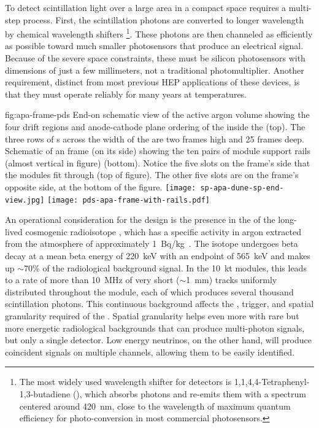 To detect scintillation light over a large area in a compact space requires a multi-step process.  First, the  scintillation photons are converted to longer wavelength by chemical wavelength shifters
\footnote{The most widely used wavelength shifter for \lar detectors is  1,1,4,4-Tetraphenyl-1,3-butadiene (), which absorbs  photons and re-emits them with a spectrum centered around \SI{420}{nm}, close to the wavelength of maximum quantum efficiency for photo-conversion in most commercial photosensors.}.
These photons are then channeled as efficiently as possible toward much smaller photosensors that produce an electrical signal. Because of the severe space constraints, these must be silicon photosensors with dimensions of just a few millimeters,  not a traditional photomultiplier.
Another requirement, distinct from most previous HEP applications of these devices, is that they must operate reliably for many years at  temperatures. 

\begin{dunefigure}{fig:apa-frame-pds}
{End-on schematic view of the active argon volume showing the four drift regions and anode-cathode plane ordering of the  inside the  (top). The three rows of s across the width of the  are two frames high and 25 frames deep. Schematic of an  frame (on its side) showing the ten pairs of  module support rails (almost vertical in figure) (bottom). Notice the five slots on the frame's side that the  modules fit through (top of figure). The other five slots are on the frame's opposite side, at the bottom of the figure.}
\texttt{[image: sp-apa-dune-sp-end-view.jpg]}
\texttt{[image: pds-apa-frame-with-rails.pdf]}
\end{dunefigure}

An operational consideration for the  design is the presence in the  of the long-lived cosmogenic radioisotope , which has a specific activity in argon extracted from the atmosphere of approximately \SI{1}{Bq/kg}~\cite{bkds}. The isotope undergoes beta decay at a mean beta energy of \SI{220}{keV} with an endpoint of \SI{565}{keV} and makes up $\sim$70\% of the radiological background signal.
In the \SI{10}{kt}  modules, this leads to a rate of more than \SI{10}{MHz} of very short ($\sim$\SI{1}{mm}) tracks uniformly distributed throughout the module, each of which produces several thousand  scintillation photons. This continuous background affects the , trigger, and spatial granularity required of the . Spatial granularity helps even more with rare but more energetic radiological backgrounds that can produce multi-photon signals, but only a single detector. Low energy neutrinos, on the other hand, will produce coincident  signals on multiple channels, allowing them to be easily identified.

